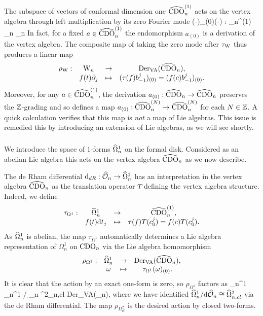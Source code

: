 The subspace of vectors of conformal dimension one $\widehat{\rm CDO}_n^{(1)}$ acts on the vertex algebra through left multiplication by its zero Fourier mode
\ben
(-)_{(0)}(-) : \CDO_n^{(1)} \times \CDO_n \to \CDO_n
\een
In fact, for a fixed $a \in \widehat{\rm CDO}_n^{(1)}$ the endomorphism $a_{(0)}$ is a derivation of the vertex algebra. The composite map of taking the zero mode after $\tau_{\rm W}$ thus produces a linear map
\[
\begin{array}{cccc}
\rho_{\rm W} :  &{{\rm W}_n} &\to& {\rm Der}_{{\rm VA}} (\widehat{\rm CDO}_n),\\ 
&f(t) \partial_j& \mapsto & (\tau(f) b_{-1}^j)_{(0)}=(f(c) b_{-1}^j)_{(0)} .
\end{array}
\]
Moreover, for any $a \in \widehat{\rm CDO}_n^{(1)}$, 
the derivation $a_{(0)} : \widehat{\rm CDO}_n \to \widehat{\rm CDO}_n$ preserves the $\mathbb Z$-grading 
and so defines a map $a_{(0)} : \widehat{\rm CDO}^{(N)}_n \to \widehat{\rm CDO}^{(N)}_n$ for each $N \in \mathbb Z$. 
A quick calculation verifies that this map is {\em not} a map of Lie algebras. 
This issue is remedied this by introducing an extension of Lie algebras, as we will see shortly. 


\subsubsection{}
We introduce the space of $1$-forms $\widehat{\Omega}^1_n$ on the formal disk. Considered as an abelian Lie algebra this acts on the vertex algebra $\widehat{\rm CDO}_n$ as we now describe.

The de Rham differential ${\rm d}_{dR} : \widehat{\mathcal O}_n \to \widehat{\Omega}_n^1$ has an
interpretation in the vertex algebra $\widehat{\rm CDO}_n$ as the translation operator $T$ defining the vertex algebra structure. 
Indeed, we define
\[
\begin{array}{cccc}
\tau_{\Omega^1} : &\widehat{\Omega}_n^1 &\to &\widehat{\rm CDO}_n^{(1)},\\
& f(t) {\rm d} t_j & \mapsto & \tau(f) T(c_0^j) = f(c) T(c_0^j).
\end{array}
\]
As $\widehat{\Omega}^1_n$ is abelian, the map $\tau_{\Omega^1}$ automatically determines a Lie algebra representation of $\Omega^1_n$ on ${\rm CDO}_n$ via the Lie algebra homomorphism
\[
\begin{array}{cccc}
\rho_{\Omega^1} : &\widehat{\Omega}_n^1 &\to& {\rm Der}_{{\rm VA}}(\widehat{\rm CDO}_n), \\ 
&\omega &\mapsto& \tau_{\Omega^1}(\omega)_{(0)} .
\end{array}
\]
It is clear that the action by an exact one-form is zero, so $\rho_{\Omega^1}$ factors as
\ben
\hOmega_n^1 \to \hOmega_n^1 / \d \hO_n \cong \hOmega^2_{n,cl}   {\rm Der}_{{\rm VA}}(\hCDO_n),
\een
where we have identified $\widehat{\Omega}_n^1 / {\rm d} \widehat{\mathcal O}_n \cong \widehat{\Omega}^2_{n,cl}$ via the de Rham differential. 
The map $\rho_{\Omega^2_{cl}}$ is the desired action by closed two-forms. 

